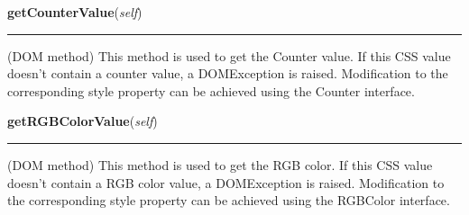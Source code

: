     \vspace{0.5ex}

\hspace{.8\funcindent}\begin{boxedminipage}{\funcwidth}

    \raggedright \textbf{getCounterValue}(\textit{self})

    \vspace{-1.5ex}

    \rule{\textwidth}{0.5\fboxrule}
\setlength{\parskip}{2ex}

(DOM method) This method is used to get the Counter value. If
this CSS value doesn't contain a counter value, a DOMException
is raised. Modification to the corresponding style property
can be achieved using the Counter interface.
\setlength{\parskip}{1ex}
    \end{boxedminipage}

    \label{cssutils:css:cssvalue:CSSPrimitiveValue:getRGBColorValue}

    \vspace{0.5ex}

\hspace{.8\funcindent}\begin{boxedminipage}{\funcwidth}

    \raggedright \textbf{getRGBColorValue}(\textit{self})

    \vspace{-1.5ex}

    \rule{\textwidth}{0.5\fboxrule}
\setlength{\parskip}{2ex}

(DOM method) This method is used to get the RGB color. If this
CSS value doesn't contain a RGB color value, a DOMException
is raised. Modification to the corresponding style property
can be achieved using the RGBColor interface.
\setlength{\parskip}{1ex}
    \end{boxedminipage}

    \label{cssutils:css:cssvalue:CSSPrimitiveValue:getRectValue}

    \vspace{0.5ex}

